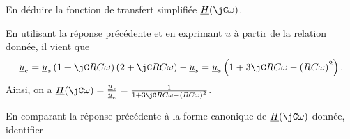 \bigskip


\repriseEntrainement


\hauteurLargeurCadreReponse		{8mm}{6cm}



\begin{enonce}
 	En déduire la fonction de transfert simplifiée $\underline{H}(\jC \omega)$.	
\end{enonce}


\begin{corrige}
	En utilisant la réponse précédente et en exprimant $\underline{u}$ à partir de la relation donnée, il vient que
\[
	\underline{u}_e = \underline{u}_s \left(1+\jC RC\omega\right) \left( 2 + \jC RC \omega\right) - \underline{u}_s = \underline{u}_s \left( 1 + 3\jC RC \omega  - \left(RC \omega \right)^2 \right).
	\]
	Ainsi, on a $\underline{H}(\jC \omega) = \frac{\underline{u}_s}{\underline{u}_e}
		= \frac{1}{ 1 + 3\jC RC \omega  - \left(RC \omega \right)^2}$.
\end{corrige}



\pauseEntrainement
\bigskip

En comparant la réponse précédente à la forme canonique de $\underline{H}(\jC\omega)$ donnée, identifier 

\smallskip
\repriseEntrainement

